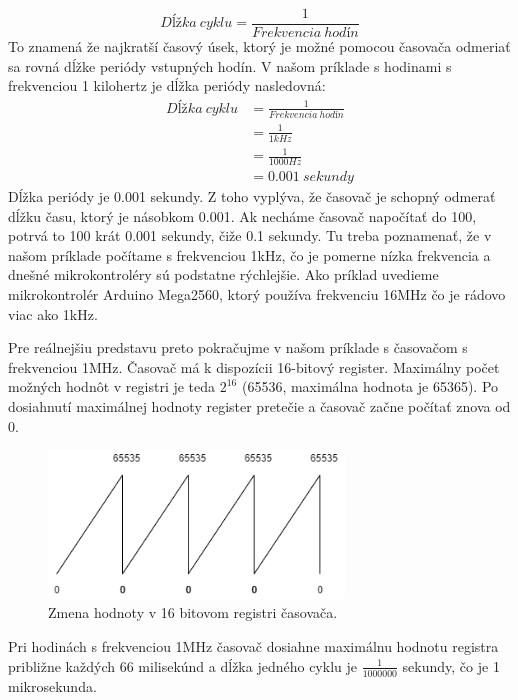 \[Dĺžka\:cyklu =\frac{1}{Frekvencia\:hodín}\]
To znamená že najkratší časový úsek, ktorý je možné pomocou časovača odmeriať sa
rovná dĺžke periódy vstupných hodín. V našom príklade s hodinami s frekvenciou 1 kilohertz je dĺžka periódy nasledovná:
\begin{equation}
    \begin{aligned}
        Dĺžka\:cyklu & = \frac{1}{Frekvencia\:hodín} \\
                     & = \frac{1}{1kHz}              \\
                     & = \frac{1}{ 1000 Hz}          \\
                     & =  0.001\:sekundy
    \end{aligned}
\end{equation}
Dĺžka periódy je 0.001 sekundy. Z toho vyplýva, že časovač je schopný odmerať dĺžku času, ktorý je násobkom 0.001. Ak necháme časovač napočítať do 100, potrvá to 100 krát 0.001 sekundy, čiže 0.1 sekundy. Tu treba poznamenať, že v našom príklade počítame s frekvenciou 1kHz, čo je pomerne nízka frekvencia a dnešné mikrokontroléry sú podstatne rýchlejšie. Ako príklad uvedieme mikrokontrolér Arduino Mega2560, ktorý používa frekvenciu 16MHz čo je rádovo viac ako 1kHz.
\par Pre reálnejšiu predstavu preto pokračujme v našom príklade s časovačom s frekvenciou 1MHz. Časovač má k dispozícii 16-bitový register. Maximálny počet
možných hodnôt v registri je teda $2^{16}$ (65536, maximálna hodnota je 65365).
Po dosiahnutí maximálnej hodnoty register pretečie a časovač začne počítať znova od 0.
\begin{figure}[!h]
    \centering
    \includegraphics[width=0.70\textwidth]{img/timer.png}
    \caption{Zmena hodnoty v 16 bitovom registri časovača.}
    \label{figure:timer1}
\end{figure}

Pri hodinách s frekvenciou 1MHz časovač dosiahne maximálnu hodnotu registra približne každých 66 milisekúnd a dĺžka jedného cyklu je $\frac{1}{1000000}$ sekundy, čo je 1 mikrosekunda.

